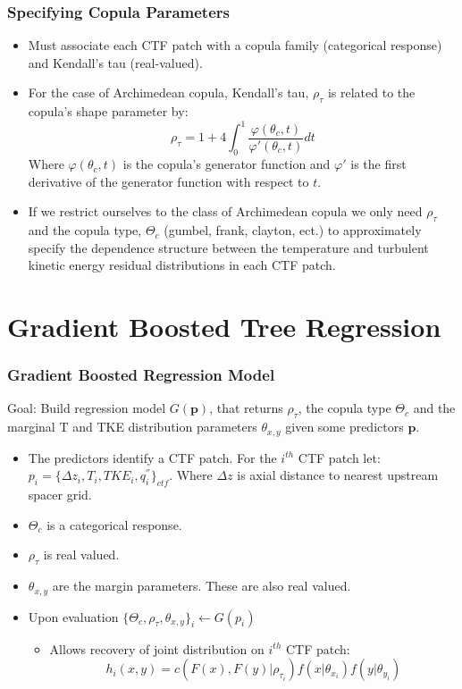 \documentclass[t, pdftex]{beamer}
\begin{document}
\begin{frame}
\frametitle{Specifying Copula Parameters}
\begin{itemize}
\item Must associate each CTF patch with a copula family (categorical response) and Kendall's tau (real-valued).
\item For the case of Archimedean copula, Kendall's tau, $\rho_\tau$ is
related to the copula's shape parameter by:
\[
\rho_\tau = 1 + 4 \int_0^1 \frac{\varphi(\theta_c,t)}{\varphi'(\theta_c, t)}dt
\]
Where $\varphi(\theta_c, t)$ is the copula's generator function and $\varphi'$ is the first derivative of the generator function with respect to $t$.
\item  If we restrict ourselves to the class of  Archimedean copula we only need $\rho_\tau$ and the copula type, $\Theta_c$ (gumbel, frank, clayton, ect.) to approximately specify the dependence structure between the temperature and turbulent kinetic energy residual distributions in each CTF patch.
\end{itemize}
\end{frame}

\section{Gradient Boosted Tree Regression}
\begin{frame}
\frametitle{Gradient Boosted Regression Model}
Goal: Build regression model $G(\mathbf p)$, that returns $\rho_\tau$, the copula type $\Theta_c$ and the marginal T and TKE distribution parameters $\theta_{x,y}$ given some predictors $\mathbf p$.
\begin{itemize}
\item The predictors identify a CTF patch.  For the $i^{th}$ CTF patch let: $p_i = \{ \Delta z_i, T_i,  TKE_i, q_i^{''} \}_{ctf}$.  Where $\Delta z$ is axial distance to nearest upstream spacer grid.
\item $\Theta_c$ is a categorical response.
\item $\rho_\tau$ is real valued.
\item $\theta_{x,y}$ are the margin parameters.  These are also real valued.
\item Upon evaluation $ \{\Theta_c, \rho_\tau, \theta_{x,y}\}_i \leftarrow G(p_i)$
\begin{itemize}
\item Allows recovery of joint distribution on $i^{th}$ CTF patch:
\[
h_i(x, y) = c(F(x), F(y)|\rho_{\tau_i}) f(x|\theta_{x_i}) f(y|\theta_{y_i})
\]
\end{itemize}
\end{itemize}
\end{frame}
\end{document}
